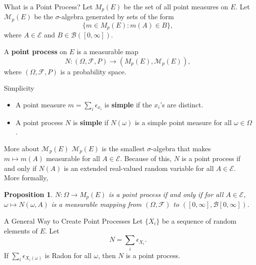 \documentclass{beamer}
\newtheorem{proposition}{Proposition}
\begin{document}
\begin{frame}{What is a Point Process?}
    Let $M_p(E)$ be the set of all point measures on $E$. Let $\mathcal{M}_p(E)$ be the $\sigma$-algebra generated by sets of the form
    \[
    \{m \in M_p(E) : m(A) \in B\},
    \]
    where $A \in \mathcal{E}$ and $B \in \mathcal{B}([0, \infty])$.

    \smallskip

    \begin{definition}
        A \textbf{point process} on $E$ is a measurable map
        \[
        N : (\Omega, \mathcal{F}, P) \to (M_p(E), \mathcal{M}_p(E)),
        \]
        where $(\Omega, \mathcal{F}, P)$ is a probability space.
    \end{definition}
\end{frame}

\begin{frame}{Simplicity}
    \begin{itemize}
        \item A point measure $m = \sum_i \epsilon_{x_i}$ is \textbf{simple} if the $x_i$'s are distinct.
        \item A point process $N$ is \textbf{simple} if $N(\omega)$ is a simple point measure for all $\omega \in \Omega$.
    \end{itemize}
\end{frame}

\begin{frame}{More about $\mathcal{M}_p(E)$}
    $\mathcal{M}_p(E)$ is the smallest $\sigma$-algebra that makes $m \mapsto m(A)$ measurable for all $A \in \mathcal{E}$. Because of this, $N$ is a point process if and only if $N(A)$ is an extended real-valued random variable for all $A \in \mathcal{E}$. More formally,
    \begin{proposition}
    $N : \Omega \to M_p(E)$ is a point process if and only if for all $A \in \mathcal{E}$, $\omega \mapsto N(\omega, A)$ is a measurable mapping from $(\Omega, \mathcal{F})$ to $([0, \infty], \mathcal{B}[0, \infty])$.
    \end{proposition}
\end{frame}

\begin{frame}{A General Way to Create Point Processes}
    Let $\{X_i\}$ be a sequence of random elements of $E$. Let
    \[
    N = \sum_i \epsilon_{X_i}.
    \]
    If $\sum_i \epsilon_{X_i(\omega)}$ is Radon for all $\omega$, then $N$ is a point process.
\end{frame}
\end{document}
